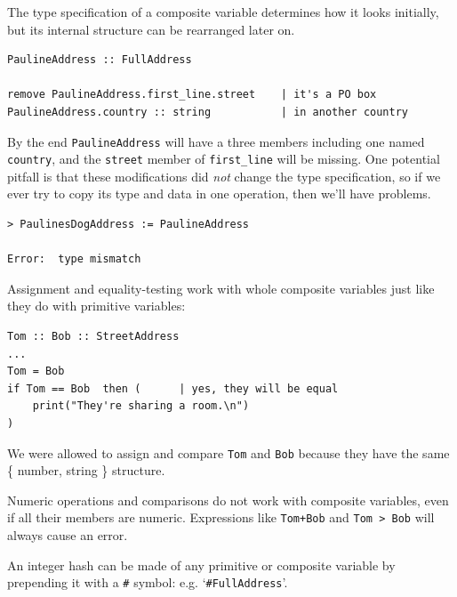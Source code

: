 \documentclass{article}
\newenvironment{code}{
       \begin{list}{}{
               \setlength{\leftmargin}{.4in}
               \setlength{\rightmargin}{0in}
               \setlength{\topsep}{.2in}
       }
       \small
       \item[] }
       { \end{list}   }
\begin{document}
The type specification of a composite variable determines how it looks initially, but its internal structure can be rearranged later on.

\begin{code} \begin{verbatim}
PaulineAddress :: FullAddress

remove PaulineAddress.first_line.street    | it's a PO box
PaulineAddress.country :: string           | in another country
\end{verbatim} \end{code}

\noindent By the end \texttt{PaulineAddress} will have a three members including one named \verb#country#, and the \texttt{street} member of \verb#first_line# will be missing.  One potential pitfall is that these modifications did \emph{not} change the type specification, so if we ever try to copy its type and data in one operation, then we'll have problems.

\begin{code} \begin{verbatim}
> PaulinesDogAddress := PaulineAddress

Error:  type mismatch
\end{verbatim} \end{code}

Assignment and equality-testing work with whole composite variables just like they do with primitive variables:

\begin{code} \begin{verbatim}
Tom :: Bob :: StreetAddress
...
Tom = Bob
if Tom == Bob  then (      | yes, they will be equal
    print("They're sharing a room.\n")
)
\end{verbatim} \end{code}

\noindent We were allowed to assign and compare \verb#Tom# and \verb#Bob# because they have the same \{ number, string \} structure.

Numeric operations and comparisons do not work with composite variables, even if all their members are numeric.  Expressions like \verb#Tom+Bob# and \verb#Tom > Bob# will always cause an error.

An integer hash can be made of any primitive or composite variable by prepending it with a \verb$#$ symbol:  e.g. `\verb$#FullAddress$'. 
 
\end{document}
